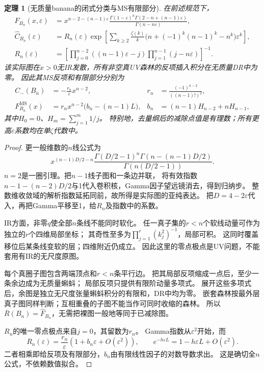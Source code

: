 \documentclass[11pt,a4paper]{ctexart}
\theoremstyle{cnplain}\newtheorem{theorem}{定理}[section]
\theoremstyle{definition}\newtheorem{definition}[theorem]{定义}
\theoremstyle{remark}\newtheorem{remark}[theorem]{注}
\begin{document}
\begin{theorem}[无质量banana的闭式分类与MS有限部分]\label{thm:masslessbanana}
在前述规范下，
\begin{align}
 F_{B_n}(x,\varepsilon)
 &=x^{n-2-(n-1)\varepsilon}
 \frac{\Gamma(1-\varepsilon)^n
       \Gamma(2-n+(n-1)\varepsilon)}{\Gamma(n-n\varepsilon)},
 \label{eq:masslessbananaexact}\\
 \widehat C_{B_n}(\varepsilon)
 &=R_n(\varepsilon)\exp\left[
 \sum_{k\ge2}\frac{\zeta(k)}k
 \bigl(n+(-1)^k(n-1)^k-n^k\bigr)\varepsilon^k\right],\\
 R_n(\varepsilon)&=
 \left[\prod_{j=0}^{n-2}((n-1)\varepsilon-j)
       \prod_{j=1}^{n-1}(j-n\varepsilon)\right]^{-1}.
\end{align}
该实际图在$x>0$无IR发散，所有非空真UV森林的反项插入积分在无质量DR中为零。
因此其MS反项和有限部分分别为
\begin{align}
 C_-(B_n)&=-\frac{r_n}{\varepsilon}x^{n-2},
 &r_n&=\frac{(-1)^{n-2}}{((n-1)!)^2},\\
 F^{\mathrm{MS}}_{B_n}(x)&=r_nx^{n-2}\bigl(b_n-(n-1)L\bigr),
 &b_n&=(n-1)H_{n-2}+nH_{n-1},\label{eq:masslessbananaMS}
\end{align}
其中$H_0=0$、$H_m=\sum_{j=1}^m1/j$。
特别地，去量纲后的减除点值是有理数；所有更高$\varepsilon$系数均在单$\zeta$代数中。
\end{theorem}
\begin{proof}
更一般维数的$n$线公式为
\[
 x^{(n-1)D/2-n}
 \frac{\Gamma(D/2-1)^n\Gamma(n-(n-1)D/2)}
 {\Gamma(n(D/2-1))}.
\]
$n=2$是一圈引理。把$n-1$线子图和一条边并联，
将有效指数$n-1-(n-2)D/2$与1代入卷积核，Gamma因子望远镜消去，得到归纳步。
整数维收敛域的解析指数延拓同前，故所得是实际图的亚纯表达。
把$D=4-2\varepsilon$代入，再把Gamma平移至1，给$R_n$及指数中的系数。

IR方面，非零$q$使全部$n$条线不能同时软化。
任一真子集的$r<n$个软线动量可作为独立的$r$个四维局部坐标；
其奇性至多为$\prod_{j=1}^r(k_j^2)^{-1}$，局部可积。
这同时覆盖移位后某条线变软的层；四维附近仍成立。
因此这里的零点极点是UV问题，不能套用有IR的无尺度原图。

每个真圈子图包含两端顶点和$r<n$条平行边。
把其局部反项缩成一点后，至少一条余边成为无质量蝌蚪；
局部反项只提供有限阶动量多项式。
展开这些多项式后，余图是独立无尺度张量蝌蚪积分的有限和，DR中均为零。
嵌套森林按最外层真子图同样判断；互相重叠的子图不能当作可同时收缩的森林。
所以$\overline R(B_n)=\widehat F_{B_n}$，无需把裸图一般地等同于已减除图。

$R_n$的唯一零点极点来自$j=0$，其留数为$r_n$。
Gamma指数从$\varepsilon^2$开始，而
\[
 R_n(\varepsilon)=\frac{r_n}{\varepsilon}
                 (1+b_n\varepsilon+O(\varepsilon^2)),\qquad
 e^{-h\varepsilon L}=1-h\varepsilon L+O(\varepsilon^2).
\]
二者相乘即给反项及有限部分，$b_n$由有限线性因子的对数导数求出。
这是确切全$n$公式，不依赖数值拟合。
\end{proof}
\end{document}
